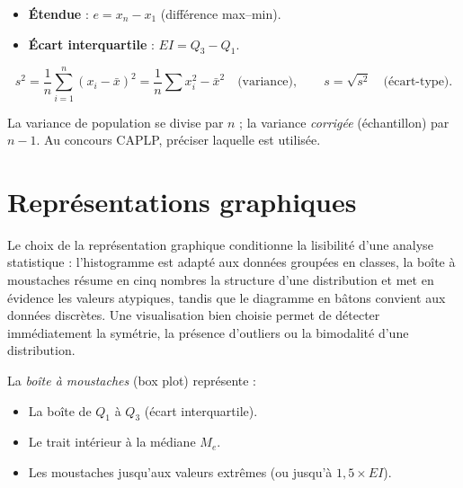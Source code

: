 \documentclass[11pt,a4paper,twoside]{book}
\begin{document}
\begin{definitionbox}
\begin{itemize}
  \item \textbf{Étendue} : $e = x_n - x_1$ (différence max–min).
  \item \textbf{Écart interquartile} : $EI = Q_3 - Q_1$.
\end{itemize}
\end{definitionbox}

\begin{definitionbox}
\[
  s^2 = \frac{1}{n}\sum_{i=1}^n (x_i-\bar{x})^2 = \frac{1}{n}\sum x_i^2 - \bar{x}^2 \quad \text{(variance)}, \qquad s = \sqrt{s^2} \quad \text{(écart-type)}.
\]
\end{definitionbox}

\begin{erreurbox}
La variance de population se divise par $n$ ; la variance \emph{corrigée} (échantillon) par $n-1$. Au concours CAPLP, préciser laquelle est utilisée.
\end{erreurbox}

\section{Représentations graphiques}

Le choix de la représentation graphique conditionne la lisibilité d'une analyse statistique : l'histogramme est adapté aux données groupées en classes, la boîte à moustaches résume en cinq nombres la structure d'une distribution et met en évidence les valeurs atypiques, tandis que le diagramme en bâtons convient aux données discrètes. Une visualisation bien choisie permet de détecter immédiatement la symétrie, la présence d'outliers ou la bimodalité d'une distribution.

\begin{definitionbox}
La \emph{boîte à moustaches} (box plot) représente :
\begin{itemize}
  \item La boîte de $Q_1$ à $Q_3$ (écart interquartile).
  \item Le trait intérieur à la médiane $M_e$.
  \item Les moustaches jusqu'aux valeurs extrêmes (ou jusqu'à $1{,}5\times EI$).
\end{itemize}
\end{definitionbox}
\end{document}

